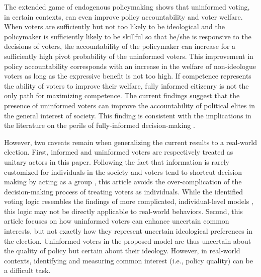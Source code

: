 \documentclass[doc,natbib,12pt]{apa6}
\begin{document}
	\par The extended game of endogenous policymaking shows that uninformed voting, in certain contexts, can even improve policy accountability and voter welfare. When voters are sufficiently but not too likely to be ideological and the policymaker is sufficiently likely to be skillful so that he/she is responsive to the decisions of voters, the accountability of the policymaker can increase for a sufficiently high pivot probability of the uninformed voters. This improvement in policy accountability corresponds with an increase in the welfare of non-ideologue voters as long as the expressive benefit is not too high. If competence represents the ability of voters to improve their welfare, fully informed citizenry is not the only path for maximizing competence. The current findings suggest that the presence of uninformed voters can improve the accountability of political elites in the general interest of society. This finding is consistent with the implications in the literature on the perils of fully-informed decision-making \citep{Prato2016thvo, Patty2017expo, Taylor2010puin, Couzin2011unin}.
	
	\par However, two caveats remain when generalizing the current results to a real-world election. First, informed and uninformed voters are respectively treated as unitary actors in this paper. Following the fact that information is rarely customized for individuals in the society and voters tend to shortcut decision-making by acting as a group \citep{Tajfel1979anin, Druckman1994napa, Huddy2002frso, Iyengar2012afno}, this article avoids the over-complication of the decision-making process of treating voters as individuals. While the identified voting logic resembles the findings of more complicated, individual-level models \citep[e.g.,][]{Feddersen1996thsw}, this logic may not be directly applicable to real-world behaviors. Second, this article focuses on how uninformed voters can enhance uncertain common interests, but not exactly how they represent uncertain ideological preferences in the election. Uninformed voters in the proposed model are thus uncertain about the quality of policy but certain about their ideology. However, in real-world contexts, identifying and measuring common interest (i.e., policy quality) can be a difficult task. 
	
\end{document}
